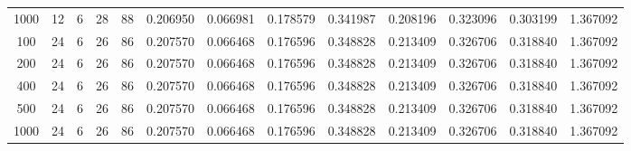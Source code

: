 \begin{table}[h]
\begin{tabular}{ccccccccccccc}
1000 & 12 & 6 & 28 & 88 & 0.206950 & 0.066981 & 0.178579 & 0.341987 & 0.208196 & 0.323096 & 0.303199 & 1.367092 \\
100 & 24 & 6 & 26 & 86 & 0.207570 & 0.066468 & 0.176596 & 0.348828 & 0.213409 & 0.326706 & 0.318840 & 1.367092 \\
200 & 24 & 6 & 26 & 86 & 0.207570 & 0.066468 & 0.176596 & 0.348828 & 0.213409 & 0.326706 & 0.318840 & 1.367092 \\
400 & 24 & 6 & 26 & 86 & 0.207570 & 0.066468 & 0.176596 & 0.348828 & 0.213409 & 0.326706 & 0.318840 & 1.367092 \\
500 & 24 & 6 & 26 & 86 & 0.207570 & 0.066468 & 0.176596 & 0.348828 & 0.213409 & 0.326706 & 0.318840 & 1.367092 \\
1000 & 24 & 6 & 26 & 86 & 0.207570 & 0.066468 & 0.176596 & 0.348828 & 0.213409 & 0.326706 & 0.318840 & 1.367092 \\
\bottomrule
\end{tabular}
\end{table}
